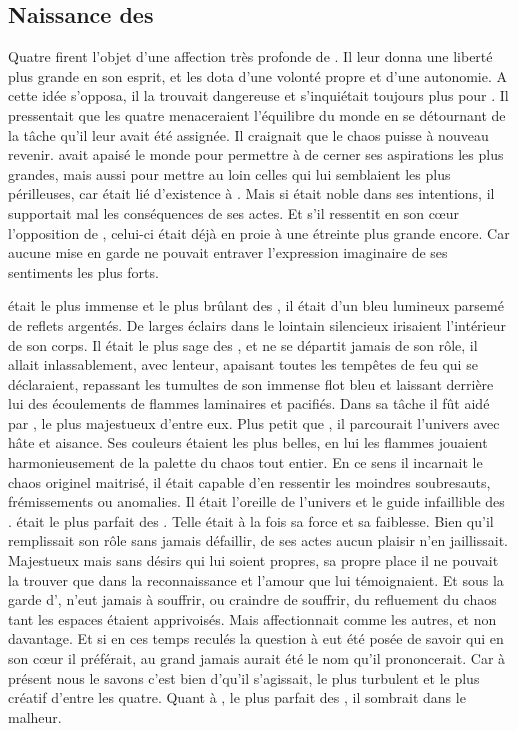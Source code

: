 \subsection{Naissance des \Dormus}

Quatre \SC firent l'objet d'une affection très profonde de \Mey. Il leur donna une liberté plus grande en son esprit, et les dota d'une volonté propre et d'une autonomie. A cette idée \Cind s'opposa, il la trouvait dangereuse et s'inquiétait toujours plus pour \Mey. Il pressentait que les quatre \Dormus menaceraient l'équilibre du monde en se détournant de la tâche qu'il leur avait été assignée. Il craignait que le chaos puisse à nouveau revenir. \Cind avait apaisé le monde pour permettre à \Mey de cerner ses aspirations les plus grandes, mais aussi pour mettre au loin celles qui lui semblaient les plus périlleuses, car \Cind était lié d'existence à \Mey. Mais si \Mey était noble dans ses intentions, il supportait mal les conséquences de ses actes. Et s'il ressentit en son cœur l'opposition de \Cind, celui-ci était déjà en proie à une étreinte plus grande encore. Car aucune mise en garde ne pouvait entraver l'expression imaginaire de ses sentiments les plus forts.      

 \Boromu était le plus immense et le plus brûlant des \SC, il était d'un bleu lumineux parsemé de reflets argentés. De larges éclairs dans le lointain silencieux irisaient l'intérieur de son corps. Il était le plus sage des \Dormus, et ne se départit jamais de son rôle, il allait inlassablement, avec lenteur, apaisant toutes les tempêtes de feu qui se déclaraient, repassant les tumultes de son immense flot bleu et laissant derrière lui des écoulements de flammes laminaires et pacifiés. Dans sa tâche il fût aidé par \Esu, le plus majestueux d'entre eux. Plus petit que \Boromu, il parcourait l'univers avec hâte et aisance. Ses couleurs étaient les plus belles, en lui les flammes jouaient harmonieusement de la palette du chaos tout entier. En ce sens il incarnait le chaos originel maitrisé, il était capable d'en ressentir les moindres soubresauts, frémissements ou anomalies. Il était l'oreille de l'univers et le guide infaillible des \SC. \Esu était le plus parfait des \Dormus. Telle était à la fois sa force et sa faiblesse. Bien qu'il remplissait son rôle sans jamais défaillir, de ses actes aucun plaisir n'en jaillissait. Majestueux mais sans désirs qui lui soient propres, sa propre place il ne pouvait la trouver que dans la reconnaissance et l'amour que \Mey lui témoignaient. Et sous la garde d'\Esu, \Mey n'eut jamais à souffrir, ou craindre de souffrir, du refluement du chaos tant les espaces étaient apprivoisés. Mais \Mey affectionnait \Esu comme les autres, et non davantage. Et si en ces temps reculés la question à \Mey eut été posée de savoir qui en son cœur il préférait, \Esu au grand jamais aurait été le nom qu'il prononcerait. Car à présent nous le savons c'est bien d'\Ogo qu'il s'agissait, le plus turbulent et le plus créatif d'entre les quatre. Quant à \Esu, le plus parfait des \Dormus, il sombrait dans le malheur. 

